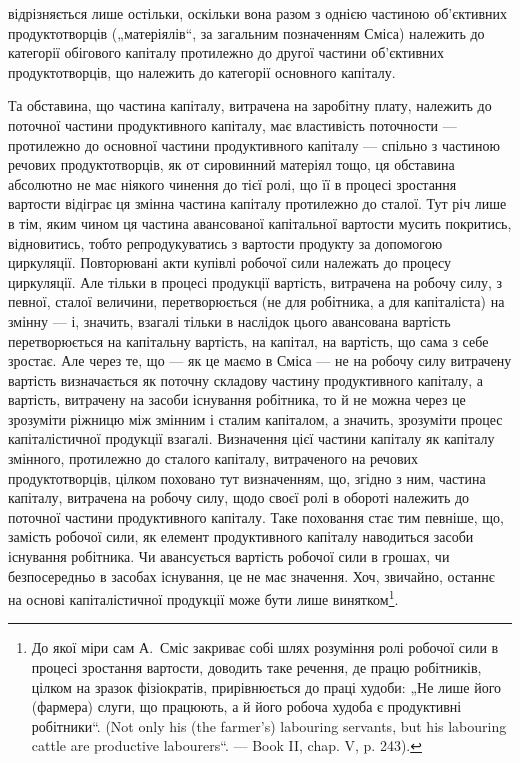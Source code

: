 \parcont{}  %
відрізняється лише остільки, оскільки вона разом з однією частиною об’єктивних
продуктотворців („матеріялів“, за загальним позначенням Сміса)
належить до категорії обігового капіталу протилежно до другої частини
об’єктивних продуктотворців, що належить до категорії основного капіталу.

Та обставина, що частина капіталу, витрачена на заробітну плату, належить
до поточної частини продуктивного капіталу, має властивість поточности
— протилежно до основної частини продуктивного капіталу —
спільно з частиною речових продуктотворців, як от сировинний матеріял
тощо, ця обставина абсолютно не має ніякого чинення до тієї ролі, що
її в процесі зростання вартости відіграє ця змінна частина капіталу протилежно
до сталої. Тут річ лише в тім, яким чином ця частина авансованої
капітальної вартости мусить покритись, відновитись, тобто репродукуватись
з вартости продукту за допомогою циркуляції. Повторювані
акти купівлі робочої сили належать до процесу циркуляції. Але тільки
в процесі продукції вартість, витрачена на робочу силу, з певної, сталої
величини, перетворюється (не для робітника, а для капіталіста) на змінну —
і, значить, взагалі тільки в наслідок цього авансована вартість перетворюється
на капітальну вартість, на капітал, на вартість, що сама з себе
зростає. Але через те, що — як це маємо в Сміса — не на робочу силу
витрачену вартість визначається як поточну складову частину продуктивного
капіталу, а вартість, витрачену на засоби існування робітника, то й
не можна через це зрозуміти ріжницю між змінним і сталим капіталом, а
значить, зрозуміти процес капіталістичної продукції взагалі. Визначення
цієї частини капіталу як капіталу змінного, протилежно до сталого капіталу,
витраченого на речових продуктотворців, цілком поховано тут
визначенням, що, згідно з ним, частина капіталу, витрачена на робочу силу,
щодо своєї ролі в обороті належить до поточної частини продуктивного
капіталу. Таке поховання стає тим певніше, що, замість робочої
сили, як елемент продуктивного капіталу наводиться засоби існування
робітника. Чи авансується вартість робочої сили в грошах, чи безпосередньо
в засобах існування, це не має значення. Хоч, звичайно, останнє
на основі капіталістичної продукції може бути лише винятком\footnote{
До якої міри сам А.~Сміс закриває собі шлях розуміння ролі робочої
сили в процесі зростання вартости, доводить таке речення, де працю робітників,
цілком на зразок фізіократів, прирівнюється до праці худоби: „Не лише його
(фармера) слуги, що працюють, а й його робоча худоба є продуктивні робітники“.
(Not only his (the farmer’s) labouring servants, but his labouring cattle are
productive labourers“. — Book II, chap. V, p. 243).
}.

